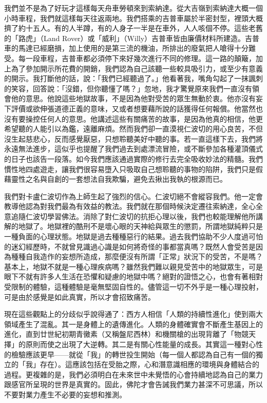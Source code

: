 我們並不是為了好玩才這樣每天舟車勞頓來到索納達。從大吉嶺到索納達大概一個小時車程，我們就這樣每天往返兩地。我們搭乘的吉普車屬於半密封型，裡頭大概擠了約十五人。有的人半蹲，有的人身子一半是在車外，人人咳個不停。這些老舊的「路虎」（Land
Rover）或「威利」（Willy）吉普車皆由廉價材料所建造。吉普車的馬達已經磨損，加上使用的是第三流的機油，所排出的廢氣把人嗆得十分難受。每一段車程，吉普車都必須停下來好幾次進行不同的修理。這一路的顛簸，加上為了參加開示所花費的開銷，我們認為自己該聽一些較具吸引力，或至少有意義的開示。我打斷他的話，說：「我們已經聽過了。」他看著我，嘴角勾起了一抹諷刺的笑容，回答說：「沒錯，但你聽懂了嗎？」忽地，我才驚覺原來我們一直沒有領會他的意思。他說這些地獄故事，不是因為他對受苦的眾生無動於衷。他亦沒有妄下評價或欲伸張道德正義的意味，又或者想要藉所說的話獲得任何報償。他當然也沒有要操控任何人的意思。他講述這些有關痛苦的故事，是因為他真的相信，他更希望聽的人能引以為鑑，遠離麻煩。然而我們卻一直漠視仁波切的用心良苦，不但沒生起慈悲心，反而感覺厭惡，只想聆聽美好中聽的事。若一直這樣下去，我們將永遠無法進步，這似乎也提醒了我們過去到處漂流冒險，或不斷參加各種灌頂儀式的日子也該告一段落。如今我們應該通過實際的修行去完全吸收妙法的精髓。我們慣性地四處遊走，讓我們很容易墮入只吸取自己想聆聽的事物的陷阱，我們只是假藉靈性之名與自創的一套想法自我欺騙，避免去揪出我執的根源而已。

我們對卡盧仁波切作為上師生起了強烈的信心。仁波切絕不會縱容我們。他一定會教導他認為對我們最為有效益的教法。我們就在那個時候決定遷往索納達，全心全意追隨仁波切學習佛法。消除了對仁波切的抗拒心理以後，我們也較能理解他所講解的地獄了。地獄裡的酷刑不是壞心眼的天神給與眾生的懲罰，所謂地獄純粹只是一種負面的心理狀態。地獄是過去種種惡行的結果。過去我們協助不少人度過可怕的迷幻經歷時，不就曾見識過心識是如何將奇怪的事都當真嗎？既然人會受苦是因為種種自我造作的妄想所造成，那麼便沒有所謂「正常」狀況下的受苦，不是嗎？基本上，地獄不就是一種心理疾病嗎？雖然我們難以親見受苦中的地獄眾生，可是眼下不就有許多人生活在恐懼和疑慮的地獄中嗎？絕對的證悟之心，也會有著相對受限制的體驗，這種體驗是毫無堅固自性的。儘管這一切不外乎是一種心理投射，可是由於感覺是如此真實，所以才會招致痛苦。

現在這些觀點上的分歧似乎說得通了：西方人相信「人類的持續性進化」使到兩大領域產生了混亂。其一是身體上的遺傳進化。人類的身體確實會不斷產生基因上的進化，直到廿世紀初期青黴素（又稱盤尼西林）和機關槍的出現背離了「物競天擇」的原則而使之出現了大逆轉。其二是有關心性能量的成長。其實這一種對心性的檢驗應該更早——就從「我」的轉世投生開始（每一個人都認為自己有一個的獨立的「我」存在）。這應該包括在受胎之際，心和潛意識相應的環境與身體結合的過程。更複雜的是，我們必須明白在未來世中未覺悟的心會持續地認為自己的業力跟感官所呈現的世界是真實的。固此，佛陀才會告誡我們業力甚深不可思議，所以不要對業力產生不必要的妄想和推測。

